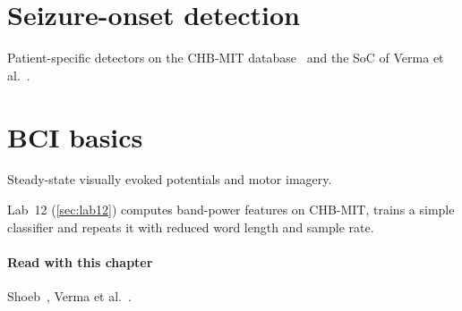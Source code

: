 \section{Seizure-onset detection}\label{sec:ch25-3}
Patient-specific detectors on the CHB-MIT database~\cite{chbmit} and the SoC of Verma et al.~\cite{verma2010}.

\section{BCI basics}\label{sec:ch25-4}
Steady-state visually evoked potentials and motor imagery.

\begin{tryit}
Lab~12 (\cref{sec:lab12}) computes band-power features on CHB-MIT, trains a simple classifier and repeats it with reduced word length and sample rate.
\end{tryit}

\paragraph{Read with this chapter} Shoeb~\cite{chbmit}, Verma et al.~\cite{verma2010}.
